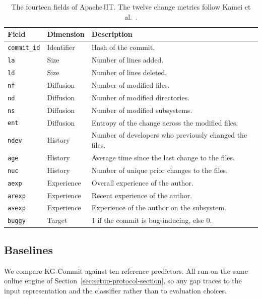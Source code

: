 \documentclass[final,5p,times,twocolumn]{elsarticle}
\theoremstyle{plain}
\begin{document}
\begin{table}[t]
\centering
\caption{The fourteen fields of ApacheJIT. The twelve change metrics follow Kamei et al.~\cite{kamei2013large}.}
\label{tab:features}
\footnotesize %
\setlength{\tabcolsep}{4pt} %
\begin{tabularx}{\columnwidth}{llX}
\toprule
Field & Dimension & Description \\
\midrule
\texttt{commit\_id} & Identifier & Hash of the commit. \\
\texttt{la}         & Size       & Number of lines added. \\
\texttt{ld}         & Size       & Number of lines deleted. \\
\texttt{nf}         & Diffusion  & Number of modified files. \\
\texttt{nd}         & Diffusion  & Number of modified directories. \\
\texttt{ns}         & Diffusion  & Number of modified subsystems. \\
\texttt{ent}        & Diffusion  & Entropy of the change across the modified files. \\
\texttt{ndev}       & History    & Number of developers who previously changed the files. \\
\texttt{age}        & History    & Average time since the last change to the files. \\
\texttt{nuc}        & History    & Number of unique prior changes to the files. \\
\texttt{aexp}       & Experience & Overall experience of the author. \\
\texttt{arexp}      & Experience & Recent experience of the author. \\
\texttt{asexp}      & Experience & Experience of the author on the subsystem. \\
\texttt{buggy}      & Target     & $1$ if the commit is bug-inducing, else $0$. \\
\bottomrule
\end{tabularx}
\end{table}


\subsection{Baselines}
\label{sec:setup-baselines-section}

We compare KG-Commit against ten reference predictors. All run on the same online engine of Section~\ref{sec:setup-protocol-section}, so any gap traces to the input representation and the classifier rather than to evaluation choices.
\end{document}
